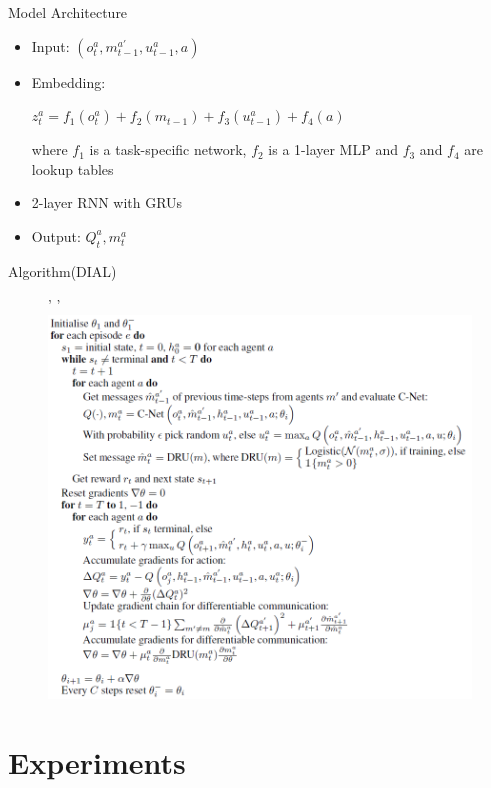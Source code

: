 \documentclass[mathserif]{beamer}
\begin{document}
\begin{frame}{Model Architecture}
  \begin{itemize}
    \item Input: $(o_{t}^{a},m_{t-1}^{a'},u_{t-1}^{a},a)$
    \item Embedding:

    $z_{t}^{a}=f_{1}(o_{t}^{a})+f_{2}(m_{t-1})+f_{3}(u_{t-1}^{a})+f_{4}(a)$

    where $f_{1}$ is a task-specific network, $f_{2}$ is a 1-layer MLP and
    $f_{3}$ and $f_{4}$ are lookup tables
    \item 2-layer RNN with GRUs
    \item Output: $Q_{t}^{a},m_{t}^{a}$
  \end{itemize}
\end{frame}

\begin{frame}{Algorithm(DIAL)}
\begin{figure}'
  '
  \centering
  \includegraphics[scale=0.5]{fig/4}
\end{figure}
\end{frame}
\section{Experiments}
\end{document}
